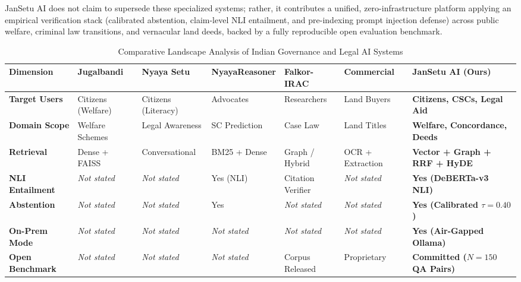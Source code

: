 \documentclass[12pt,a4paper,oneside]{report}
\begin{document}
JanSetu AI does not claim to supersede these specialized systems; rather, it contributes a unified, zero-infrastructure platform applying an empirical verification stack (calibrated abstention, claim-level NLI entailment, and pre-indexing prompt injection defense) across public welfare, criminal law transitions, and vernacular land deeds, backed by a fully reproducible open evaluation benchmark.

\begin{table}[H]
\centering
\scriptsize
\caption{Comparative Landscape Analysis of Indian Governance and Legal AI Systems}
\label{tab:comparative_landscape}
\begin{tabularx}{\textwidth}{p{2.0cm}p{1.9cm}p{1.9cm}p{1.9cm}p{1.9cm}p{1.7cm}X}
\toprule
\textbf{Dimension} & \textbf{Jugalbandi} & \textbf{Nyaya Setu} & \textbf{NyayaReasoner} & \textbf{Falkor-IRAC} & \textbf{Commercial} & \textbf{JanSetu AI (Ours)} \\
\midrule
\textbf{Target Users} & Citizens (Welfare) & Citizens (Literacy) & Advocates & Researchers & Land Buyers & \textbf{Citizens, CSCs, Legal Aid} \\
\addlinespace
\textbf{Domain Scope} & Welfare Schemes & Legal Awareness & SC Prediction & Case Law & Land Titles & \textbf{Welfare, Concordance, Deeds} \\
\addlinespace
\textbf{Retrieval} & Dense + FAISS & Conversational & BM25 + Dense & Graph / Hybrid & OCR + Extraction & \textbf{Vector + Graph + RRF + HyDE} \\
\addlinespace
\textbf{NLI Entailment} & \textit{Not stated} & \textit{Not stated} & Yes (NLI) & Citation Verifier & \textit{Not stated} & \textbf{Yes (DeBERTa-v3 NLI)} \\
\addlinespace
\textbf{Abstention} & \textit{Not stated} & \textit{Not stated} & Yes & \textit{Not stated} & \textit{Not stated} & \textbf{Yes (Calibrated $\tau=0.40$)} \\
\addlinespace
\textbf{On-Prem Mode} & \textit{Not stated} & \textit{Not stated} & \textit{Not stated} & \textit{Not stated} & \textit{Not stated} & \textbf{Yes (Air-Gapped Ollama)} \\
\addlinespace
\textbf{Open Benchmark} & \textit{Not stated} & \textit{Not stated} & \textit{Not stated} & Corpus Released & Proprietary & \textbf{Committed ($N=150$ QA Pairs)} \\
\bottomrule
\end{tabularx}
\end{table}

\newpage
\end{document}
